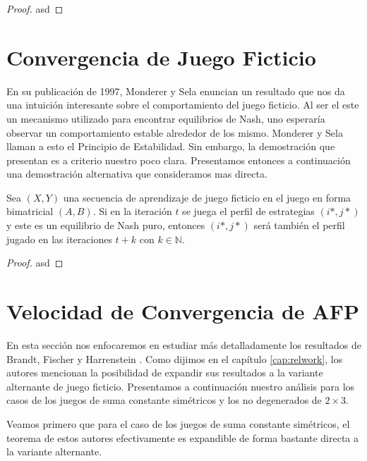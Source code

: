 \begin{proof}
    asd

\end{proof}

\section{Convergencia de Juego Ficticio}

En su publicación de 1997, Monderer y Sela \cite{no:cycling} enuncian un resultado que nos da una intuición interesante sobre el comportamiento del juego ficticio. Al ser el este un mecanismo utilizado para encontrar equilibrios de Nash, uno esperaría observar un comportamiento estable alrededor de los mismo. Monderer y Sela llaman a esto el Principio de Estabilidad. Sin embargo, la demostración que presentan es a criterio nuestro poco clara. Presentamos entonces a continuación una demostración alternativa que consideramos mas directa.

\begin{theorem}
    Sea $(X, Y)$ una secuencia de aprendizaje de juego ficticio en el juego en forma bimatricial $(A, B)$. Si en la iteración $t$ se juega el perfil de estrategias $(i*, j*)$ y este es un equilibrio de Nash puro, entonces $(i*, j*)$ será también el perfil jugado en las iteraciones $t+k$ con $k \in \mathbb{N}$.
\end{theorem}

\begin{proof}
    asd
\end{proof}

\section{Velocidad de Convergencia de AFP}

En esta sección nos enfocaremos en estudiar más detalladamente los resultados de Brandt, Fischer y Harrenstein \cite{brandt:rate:convergence}. Como dijimos en el capítulo \ref{cap:relwork}, los autores mencionan la posibilidad de expandir sus resultados a la variante alternante de juego ficticio. Presentamos a continuación nuestro análisis para los casos de los juegos de suma constante simétricos y los no degenerados de $2 \times 3$.


Veamos primero que para el caso de los juegos de suma constante simétricos, el teorema de estos autores efectivamente es expandible de forma bastante directa a la variante alternante.


